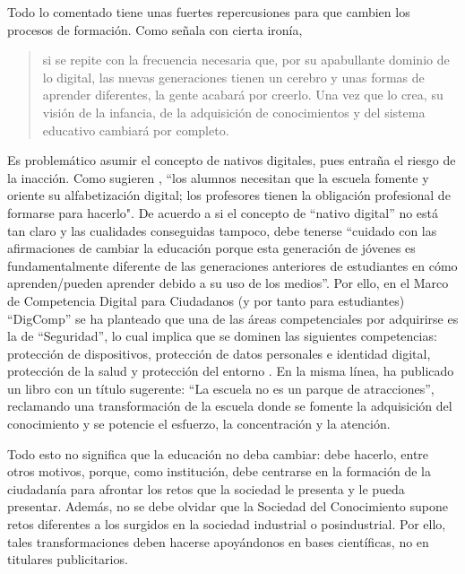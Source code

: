 \documentclass[spanish]{textolivre}
\begin{document}
Todo lo comentado tiene unas fuertes repercusiones para que cambien los procesos de formación. Como señala \textcite{desmurget_fabrica_2020} con cierta ironía,

\begin{quote}
    si se repite con la frecuencia necesaria que, por su apabullante dominio de lo digital, las nuevas generaciones tienen un cerebro y unas formas de aprender diferentes, la gente acabará por creerlo. Una vez que lo crea, su visión de la infancia, de la adquisición de conocimientos y del sistema educativo cambiará por completo. \cite[p. 39]{desmurget_fabrica_2020}
\end{quote}

 Es problemático asumir el concepto de nativos digitales, pues entraña el riesgo de la inacción. Como sugieren \textcite[p. 153]{fernandez_enguita_larga_2017}, “los alumnos necesitan que la escuela fomente y oriente su alfabetización digital; los profesores tienen la obligación profesional de formarse para hacerlo".  De acuerdo a \textcite[p. 137]{kirschner_myths_2017} si el concepto de “nativo digital” no está tan claro y las cualidades conseguidas tampoco, debe tenerse “cuidado con las afirmaciones de cambiar la educación porque esta generación de jóvenes es fundamentalmente diferente de las generaciones anteriores de estudiantes en cómo aprenden/pueden aprender debido a su uso de los medios”. Por ello, en el Marco de Competencia Digital para Ciudadanos (y por tanto para estudiantes) “DigComp” se ha planteado que una de las áreas competenciales por adquirirse es la de “Seguridad”, lo cual implica que se dominen las siguientes competencias: protección de dispositivos, protección de datos personales e identidad digital, protección de la salud y protección del entorno \cite{carretero_digcomp_2017, vuorikari_digcomp_2022}. En la misma línea, \textcite{luri2020escuela} ha publicado un libro con un título sugerente: “La escuela no es un parque de atracciones”, reclamando una transformación de la escuela donde se fomente la adquisición del conocimiento y se potencie el esfuerzo, la concentración y la atención.

Todo esto no significa que la educación no deba cambiar: debe hacerlo, entre otros motivos, porque, como institución, debe centrarse en la formación de la ciudadanía para afrontar los retos que la sociedad le presenta y le pueda presentar. Además, no se debe olvidar que la Sociedad del Conocimiento supone retos diferentes a los surgidos en la sociedad industrial o posindustrial. Por ello, tales transformaciones deben hacerse apoyándonos en bases científicas, no en titulares publicitarios.
\end{document}
